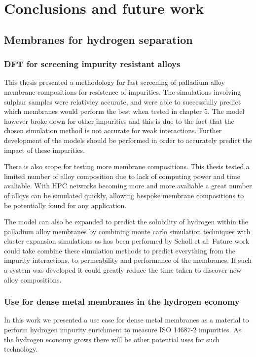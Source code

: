 \chapter{Conclusions and future work}

\section{Membranes for hydrogen separation}
\subsection{DFT for screening impurity resistant alloys}\label{simconc}
This thesis presented a methodology for fast screening of palladium alloy membrane compositions for resistence of impurities. The simulations involving sulphur samples were relativley accurate, and were able to successfully predict which membranes would perform the best when tested in chapter 5. The model however broke down for other impurities and this is due to the fact that the chosen simulation method is not accurate for weak interactions. \cite{dftbook1} Further development of the models should be performed in order to accurately predict the impact of these impurities. 

There is also scope for testing more membrane compositions. This thesis tested a limited number of alloy composition due to lack of computing power and time avaliable. With HPC networks becoming more and more avaliable \cite{morgan_burt_feldman_2020} a great number of alloys can be simulated quickly, allowing bespoke membrane compositions to be potentially found for any application. 

The model can also be expanded to predict the solubility of hydrogen within the palladium alloy membranes by combining monte carlo simulation techniques with cluster expansion simulations as has been performed by Scholl et al. \cite{SHOLL2007462} Future work could take combine these simulation methods to predict everything from the impurity interactions, to permeability and performance of the membranes. If such a system was developed it could greatly reduce the time taken to discover new alloy compositions. 

\subsection{Use for dense metal membranes in the hydrogen economy}
In this work we presented a use case for dense metal membranes as a material to perform hydrogen impurity enrichment to measure ISO 14687-2 impurities. As the hydrogen economy grows there will be other potential uses for such technology. 

